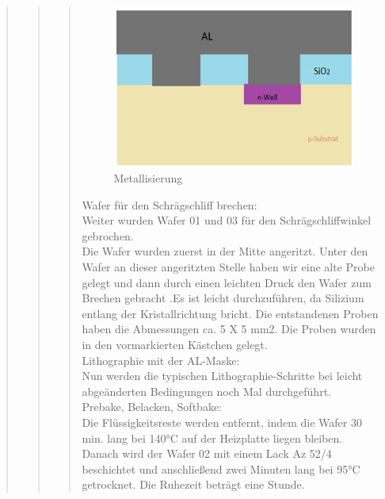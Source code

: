 \begin{quote}
\begin{quote}
\begin{quote}
    		\begin{figure}[H]
				\hspace{3 cm}
                  \includegraphics[scale=1, trim = 0cm 0cm 0cm 0cm,clip]
                	{./HerstellungBilder/Wafer02NachderMetallisierung.png}
                  \caption{Metallisierung}
                \label{fig:metall}
            \end{figure}
            
    	\vspace{2em}
    	
    	Wafer für den Schrägschliff brechen:\\
 
		Weiter wurden Wafer 01 und 03 für den Schrägschliffwinkel gebrochen.\\
		Die Wafer wurden zuerst in der Mitte angeritzt. Unter den Wafer an 
		dieser angeritzten Stelle haben wir eine alte Probe gelegt und dann 
		durch einen leichten Druck den Wafer zum Brechen gebracht .Es ist leicht 
		durchzuführen, da Silizium entlang der Kristallrichtung bricht. Die 
		entstandenen Proben haben die Abmessungen ca. 5 X 5 mm2. Die Proben 
		wurden in den vormarkierten Kästchen gelegt.\\

		Lithographie mit der AL-Maske:\\

		Nun werden die typischen Lithographie-Schritte bei leicht abgeänderten 
		Bedingungen noch Mal durchgeführt.\\

		Prebake, Belacken, Softbake: \\

		Die Flüssigkeitsreste werden entfernt, indem die Wafer 30 min. lang bei 
		140°C auf der Heizplatte liegen bleiben.\\

		Danach wird der Wafer 02 mit einem Lack  Az 52/4 beschichtet und 
		anschließend zwei Minuten lang bei 95°C getrocknet. Die Ruhezeit 
		beträgt eine Stunde.\\


\end{quote}
\end{quote}
\end{quote}
